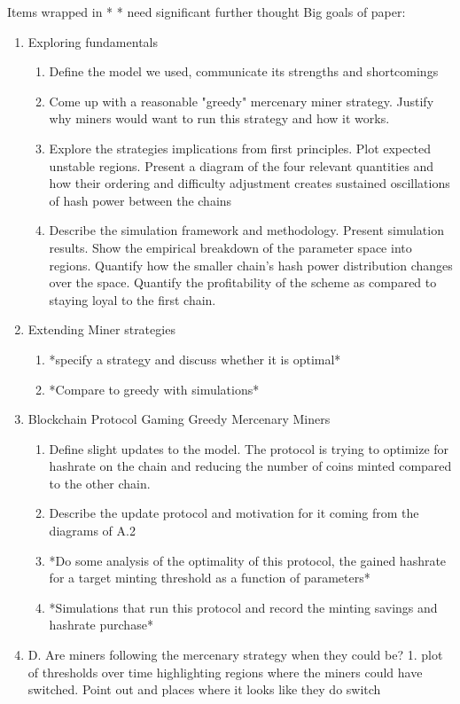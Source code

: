 \documentclass[10pt, preprint]{aastex}
\begin{document}
Items wrapped in * * need significant further thought
Big goals of paper:
\begin{enumerate}
\item
Exploring fundamentals
\begin{enumerate}
\item
Define the model we used, communicate its strengths and shortcomings
\item
Come up with a reasonable "greedy" mercenary miner strategy. Justify why miners would want to run this strategy and how it works.
\item
Explore the strategies implications from first principles.  Plot expected unstable regions.  Present a diagram of the four relevant quantities and how their ordering and difficulty adjustment creates sustained oscillations of hash power between the chains
\item
Describe the simulation framework and methodology.  Present simulation results.  Show the empirical breakdown of the parameter space into regions.  Quantify how the smaller chain's hash power distribution changes over the space.  Quantify the profitability of the scheme as compared to staying loyal to the first chain.
\end{enumerate}
\item
Extending Miner strategies
\begin{enumerate}
\item
*specify a strategy and discuss whether it is optimal*
\item
*Compare to greedy with simulations*
\end{enumerate}
\item
 Blockchain Protocol Gaming Greedy Mercenary Miners
 \begin{enumerate}
 \item
Define slight updates to the model.  The protocol is trying to optimize for hashrate on the chain and reducing the number of coins minted compared to the other chain.
\item
Describe the update protocol and motivation for it coming from the diagrams of A.2
\item
*Do some analysis of the optimality of this protocol, the gained hashrate for a target minting threshold as a function of parameters*
\item
*Simulations that run this protocol and record the minting savings and hashrate purchase*
\end{enumerate}

\item
D. Are miners following the mercenary strategy when they could be?
1. plot of thresholds over time highlighting regions where the miners could have switched.  Point out and places where it looks like they do switch
\end{enumerate}
\end{document}
